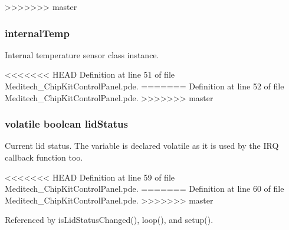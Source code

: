 \begin{DoxyCode}
\begin{DoxyCode}
\begin{DoxyCode}
\begin{DoxyCode}
>>>>>>> master
\hypertarget{_meditech___chip_kit_control_panel_8pde_adcfca3504612462229db71750def77f9}{
\subsubsection[{internal\-Temp}]{ internal\-Temp}}\label{_meditech___chip_kit_control_panel_8pde_adcfca3504612462229db71750def77f9}


Internal temperature sensor class instance. 



<<<<<<< HEAD
Definition at line 51 of file Meditech\-\_\-\-Chip\-Kit\-Control\-Panel.\-pde.
=======
Definition at line 52 of file Meditech\-\_\-\-Chip\-Kit\-Control\-Panel.\-pde.
>>>>>>> master

\hypertarget{_meditech___chip_kit_control_panel_8pde_adea51712174a5f82a31231a67e0d4608}{
\subsubsection[{lid\-Status}]{\setlength{\rightskip}{0pt plus 5cm}volatile boolean lid\-Status}}\label{_meditech___chip_kit_control_panel_8pde_adea51712174a5f82a31231a67e0d4608}


Current lid status. The variable is declared volatile as it is used by the I\-R\-Q callback function too. 



<<<<<<< HEAD
Definition at line 59 of file Meditech\-\_\-\-Chip\-Kit\-Control\-Panel.\-pde.
=======
Definition at line 60 of file Meditech\-\_\-\-Chip\-Kit\-Control\-Panel.\-pde.
>>>>>>> master



Referenced by is\-Lid\-Status\-Changed(), loop(), and setup().

\hypertarget{_meditech___chip_kit_control_panel_8pde_a3134d7e85042180eb421c3f6ee88d3b3}{
}
\end{DoxyCode}
\end{DoxyCode}
\end{DoxyCode}
\end{DoxyCode}
